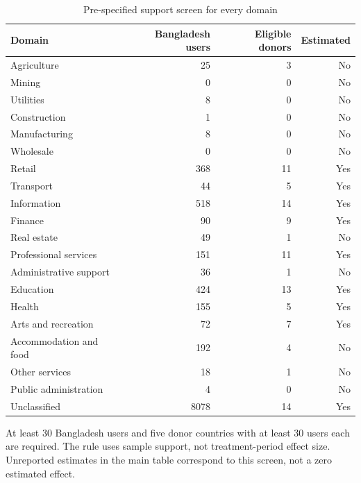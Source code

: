 \begin{table}[H]
\centering
\small
\caption{Pre-specified support screen for every domain}
\label{tab:sector_support}
\begin{threeparttable}
\begin{tabular}{@{}p{}rrr@{}}
\toprule
Domain & Bangladesh users & Eligible donors & Estimated \\
\midrule
Agriculture & 25 & 3 & No \\
Mining & 0 & 0 & No \\
Utilities & 8 & 0 & No \\
Construction & 1 & 0 & No \\
Manufacturing & 8 & 0 & No \\
Wholesale & 0 & 0 & No \\
Retail & 368 & 11 & Yes \\
Transport & 44 & 5 & Yes \\
Information & 518 & 14 & Yes \\
Finance & 90 & 9 & Yes \\
Real estate & 49 & 1 & No \\
Professional services & 151 & 11 & Yes \\
Administrative support & 36 & 1 & No \\
Education & 424 & 13 & Yes \\
Health & 155 & 5 & Yes \\
Arts and recreation & 72 & 7 & Yes \\
Accommodation and food & 192 & 4 & No \\
Other services & 18 & 1 & No \\
Public administration & 4 & 0 & No \\
Unclassified & 8078 & 14 & Yes \\
\bottomrule
\end{tabular}
\begin{tablenotes}[flushleft]
\footnotesize
\item At least 30 Bangladesh users and five donor countries with at least 30 users each are required. The rule uses sample support, not treatment-period effect size. Unreported estimates in the main table correspond to this screen, not a zero estimated effect.
\end{tablenotes}
\end{threeparttable}
\end{table}
